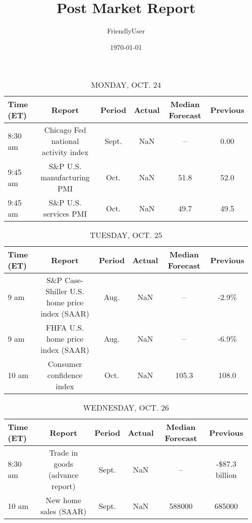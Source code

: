 \documentclass{article}%
\title{Post Market Report}%
\author{FriendlyUser}%
\date{\today}%
\begin{document}
%
\normalsize%


\begin{table}[htbp]%
\caption{MONDAY, OCT. 24}%
\centering%
\begin{adjustbox}{width=1\textwidth}%
\begin{tabular}{lccccc}
\toprule
Time (ET) &                              Report & Period & Actual & Median Forecast & Previous \\
\midrule
  8:30 am & Chicago Fed national activity index &  Sept. &    NaN &              -- &     0.00 \\
  9:45 am &          S\&P U.S. manufacturing PMI &   Oct. &    NaN &            51.8 &     52.0 \\
  9:45 am &               S\&P U.S. services PMI &   Oct. &    NaN &            49.7 &     49.5 \\
\bottomrule
\end{tabular}
%
\end{adjustbox}%
\end{table}

%


\begin{table}[htbp]%
\caption{TUESDAY, OCT. 25}%
\centering%
\begin{adjustbox}{width=1\textwidth}%
\begin{tabular}{lccccc}
\toprule
Time (ET) &                                        Report & Period & Actual & Median Forecast & Previous \\
\midrule
     9 am & S\&P Case-Shiller U.S. home price index (SAAR) &   Aug. &    NaN &              -- &    -2.9\% \\
     9 am &             FHFA U.S. home price index (SAAR) &   Aug. &    NaN &              -- &    -6.9\% \\
    10 am &                     Consumer confidence index &   Oct. &    NaN &           105.3 &    108.0 \\
\bottomrule
\end{tabular}
%
\end{adjustbox}%
\end{table}

%


\begin{table}[htbp]%
\caption{WEDNESDAY, OCT. 26}%
\centering%
\begin{adjustbox}{width=1\textwidth}%
\begin{tabular}{lccccc}
\toprule
Time (ET) &                          Report & Period & Actual & Median Forecast &       Previous \\
\midrule
  8:30 am & Trade in goods (advance report) &  Sept. &    NaN &              -- & -\$87.3 billion \\
    10 am &           New home sales (SAAR) &  Sept. &    NaN &          588000 &         685000 \\
\bottomrule
\end{tabular}
%
\end{adjustbox}%
\end{table}
\end{document}
